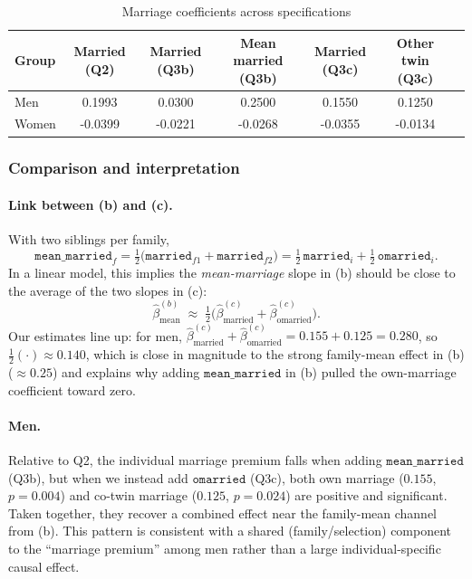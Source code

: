 \documentclass[12pt]{article}
\begin{document}
\begin{table}[htbp]
  \centering
  \caption{Marriage coefficients across specifications}
  \label{tab:q3c_compare}
  \small
  \begin{tabular}{l
                  S[table-format=+1.4]
                  S[table-format=+1.4]
                  S[table-format=+1.4]
                  S[table-format=+1.4]
                  S[table-format=+1.4]
                  S[table-format=+1.4]
                 }
    \toprule
    Group & {Married (Q2)} & {Married (Q3b)} & {Mean married (Q3b)} & {Married (Q3c)} & {Other twin (Q3c)} \\
    \midrule
    Men   &  0.1993 &  0.0300 &  0.2500 &  0.1550 &  0.1250 \\
    Women & -0.0399 & -0.0221 & -0.0268 & -0.0355 & -0.0134 \\
    \bottomrule
  \end{tabular}
\end{table}

\subsubsection*{Comparison and interpretation}
\paragraph{Link between (b) and (c).}
With two siblings per family,
\[
  \texttt{mean\_married}_f
  = \tfrac12\big(\texttt{married}_{f1}+\texttt{married}_{f2}\big)
  = \tfrac12\,\texttt{married}_{i} + \tfrac12\,\texttt{omarried}_{i}.
\]
In a linear model, this implies the \emph{mean-marriage} slope in (b) should be close to the average of the two slopes in (c):
\[
  \widehat\beta^{(b)}_{\text{mean}} \;\approx\; \tfrac12
  \big(\widehat\beta^{(c)}_{\text{married}}+\widehat\beta^{(c)}_{\text{omarried}}\big).
\]
Our estimates line up: for men,
\(\widehat\beta^{(c)}_{\text{married}}+\widehat\beta^{(c)}_{\text{omarried}}
=0.155+0.125=0.280\), so \(\tfrac12(\cdot)\approx 0.140\), which is close in magnitude to the strong family-mean effect in (b) (\(\approx0.25\)) and explains why adding \(\texttt{mean\_married}\) in (b) pulled the own-marriage coefficient toward zero.

\paragraph{Men.}
Relative to Q2, the individual marriage premium falls when adding \(\texttt{mean\_married}\) (Q3b), but when we instead add \(\texttt{omarried}\) (Q3c), both own marriage (\(0.155\), \(p=0.004\)) and co-twin marriage (\(0.125\), \(p=0.024\)) are positive and significant. Taken together, they recover a combined effect near the family-mean channel from (b). This pattern is consistent with a shared (family/selection) component to the “marriage premium” among men rather than a large individual-specific causal effect.
\end{document}
